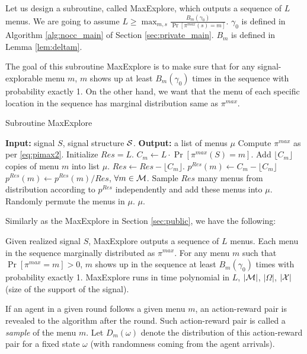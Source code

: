 Let us design a subroutine, called  MaxExplore, which outputs a sequence of $L$ menus. We are going to assume $L \geq \max_{m,s} \frac{B_m(\gamma_0)}{ \Pr[\pi^{max}(s)=m]}$. $\gamma_0$ is defined in Algorithm \ref{alg:nocc_main} of Section \ref{sec:private_main}. $B_m$ is defined in Lemma \ref{lem:deltam}.

The goal of this subroutine MaxExplore is to make sure that for any signal-explorable menu $m$, $m$ shows up at least $B_m(\gamma_0)$ times in the sequence with probability exactly 1. On the other hand, we want that the menu of each specific location in the sequence has marginal distribution same as $\pi^{max}$.

 \begin{algorithm}[H]
    \caption{Subroutine MaxExplore}
    	\label{alg:nocc_explore}
    \begin{algorithmic}[1]
	\STATE \textbf{Input:} signal $S$, signal structure $\S$.
	\STATE \textbf{Output:} a list of menus $\mu$
	\STATE Compute $\pi^{max}$ as per \eqref{eq:pimax2}.
		\STATE Initialize $Res = L$.
			\STATE $C_m \leftarrow L \cdot \Pr[\pi^{max}(S) = m]$.
                     		\STATE Add $\lfloor C_m\rfloor$ copies of menu $m$ into list $\mu$.
			\STATE $Res \leftarrow Res -\lfloor C_m \rfloor $.
			\STATE $p^{Res}(m)\leftarrow  C_m -  \lfloor C_m\rfloor$
		\ENDFOR
		\STATE $p^{Res}(m) \leftarrow p^{Res}(m) / Res$, $\forall m \in \M$.
		\STATE Sample $Res$ many menus from distribution according to $p^{Res}$ independently and add these menus into $\mu$.
		\STATE Randomly permute the menus in $\mu$.
	\RETURN $\mu$.	
     \end{algorithmic}
\end{algorithm}

Similarly as the MaxExplore in Section \ref{sec:public}, we have the following:
\begin{claim}
\label{clm:maxexplore_nocc}
Given realized signal $S$, MaxExplore outputs a sequence of $L$ menus. Each menu in the sequence marginally distributed as $\pi^{max}$. For any menu $m$ such that $\Pr[\pi^{max} = m] >0$, $m$ shows up in the sequence at least $B_m(\gamma_0)$ times with probability exactly 1. MaxExplore runs in time polynomial in $L$, $|\M|$, $|\varOmega|$, $|\X|$ (size of the support of the signal).
\end{claim}

If an agent in a given round follows a given menu $m$,  an action-reward pair is revealed to the algorithm after the round. Such action-reward pair is called a \emph{sample} of the menu $m$. Let $D_m(\omega)$ denote the distribution of this action-reward pair for a fixed state $\omega$
(with randomness coming from the agent arrivals).

